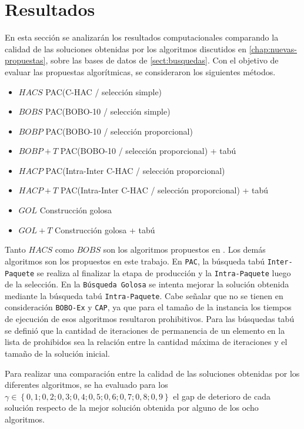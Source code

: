 \section{Resultados}\label{sect:resultados}

En esta sección se analizarán los resultados computacionales comparando la calidad de las soluciones obtenidas por los algoritmos discutidos en \autoref{chap:nuevas-propuestas}, sobre las bases de datos de \autoref{sect:busquedas}. Con el objetivo de evaluar las propuestas algorítmicas, se consideraron los siguientes métodos.

\begin{itemize}
\item{$HACS$} PAC(C-HAC / selección simple)
\item{$BOBS$} PAC(BOBO-10 / selección simple)
\item{$BOBP$} PAC(BOBO-10 / selección proporcional)
\item{$BOBP+T$} PAC(BOBO-10 / selección proporcional) + tabú
\item{$HACP$} PAC(Intra-Inter C-HAC / selección proporcional)
\item{$HACP+T$} PAC(Intra-Inter C-HAC / selección proporcional) + tabú
\item{$GOL$} Construcción golosa
\item{$GOL+T$} Construcción golosa + tabú
\end{itemize}

Tanto $HACS$ como $BOBS$ son los algoritmos propuestos en \cite{journals/tkde/Amer-YahiaBCFMZ14}. Los demás algoritmos son los propuestos en este trabajo. En \texttt{PAC}, la búsqueda tabú \texttt{Inter-Paquete} se realiza al finalizar la etapa de producción y la \texttt{Intra-Paquete} luego de la selección. En la \texttt{Búsqueda Golosa} se intenta mejorar la solución obtenida mediante la búsqueda tabú \texttt{Intra-Paquete}. Cabe señalar que no se tienen en consideración \texttt{BOBO-Ex} y \texttt{CAP}, ya que para el tamaño de la instancia los tiempos de ejecución de esos algoritmos resultaron prohibitivos. Para las búsquedas tabú se definió que la cantidad de iteraciones de permanencia de un elemento en la lista de prohibidos sea la relación entre la cantidad máxima de iteraciones y el tamaño de la solución inicial.

Para realizar una comparación entre la calidad de las soluciones obtenidas por los diferentes algoritmos, se ha evaluado para los $\gamma \in \left\{0,1; 0,2; 0,3; 0,4; 0,5; 0,6; 0,7; 0,8; 0,9\right\}$ el gap de deterioro de cada solución respecto de la mejor solución obtenida por alguno de los ocho algoritmos.

